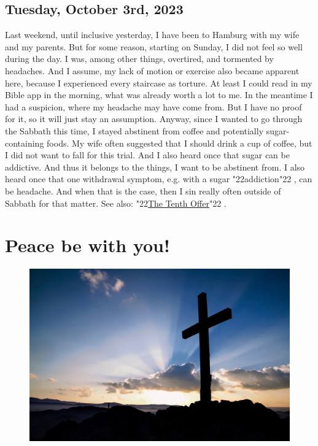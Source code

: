 \documentclass[12pt,a4paper]{article}
\newcommand{\q}[1]{\char"22{#1}\char"22 }
\begin{document}
	\subsection{Tuesday, October 3rd, 2023}
		Last weekend,
		until inclusive yesterday,
		I have been to Hamburg with my wife and my parents.
		But for some reason,
		starting on Sunday,
		I did not feel so well during the day.
		I was,
		among other things,
		overtired,
		and tormented by headaches.
		And I assume,
		my lack of motion or exercise also became apparent here,
		because I experienced every staircase as torture.
		At least I could read in my Bible app in the morning,
		what was already worth a lot to me.
		In the meantime I had a suspicion,
		where my headache may have come from.
		But I have no proof for it,
		so it will just stay an assumption.
		Anyway,
		since I wanted to go through the Sabbath this time,
		I stayed abstinent from coffee and potentially sugar-containing foods.
		My wife often suggested that I should drink a cup of coffee,
		but I did not want to fall for this trial.
		And I also heard once that sugar can be addictive.
		And thus it belongs to the things,
		I want to be abstinent from.
		I also heard once that one withdrawal symptom,
		e.g. with a sugar \q{addiction},
		can be headache.
		And when that is the case,
		then I sin really often outside of Sabbath for that matter.
		See also: \q{\hyperref[TheTenthOffer]{The Tenth Offer}}.
	
	\newpage
	\section{Peace be with you!}
	\begin{figure}[h]
		\centering
		\includegraphics[width=1\textwidth,keepaspectratio]{"FreeChristian.jpeg"}
	\end{figure}
	
\end{document}
